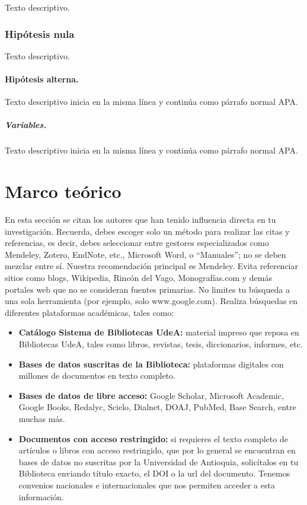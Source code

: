    Texto descriptivo.
    
    \subsubsection{Hipótesis nula}

    Texto descriptivo.

        \paragraph{Hipótesis alterna. }
        
        Texto descriptivo inicia en la misma línea y continúa como párrafo normal APA.
        
        \subparagraph{Variables.}
        
        Texto descriptivo inicia en la misma línea y continúa como párrafo normal APA.

\newpage
\section{Marco teórico}

En esta sección se citan los autores que han tenido influencia directa en tu investigación. Recuerda, debes escoger solo un método para realizar las citas y referencias, es decir, debes seleccionar entre gestores especializados como Mendeley, Zotero, EndNote, etc., Microsoft Word, o “Manuales”; no se deben mezclar entre sí. Nuestra recomendación principal es Mendeley. Evita referenciar sitios como blogs, Wikipedia, Rincón del Vago, Monografías.com y demás portales web que no se consideran fuentes primarias. No limites tu búsqueda a una sola herramienta (por ejemplo, solo www.google.com). Realiza búsquedas en diferentes plataformas académicas, tales como:

\begin{itemize}
    \item \textbf{Catálogo Sistema de Bibliotecas UdeA:} material impreso que reposa en Bibliotecas UdeA, tales como libros, revistas, tesis, diccionarios, informes, etc.
    \item\textbf{Bases de datos suscritas de la Biblioteca:} plataformas digitales con millones de documentos en texto completo.
    \item\textbf{Bases de datos de libre acceso:} Google Scholar, Microsoft Academic, Google Books, Redalyc, Scielo, Dialnet, DOAJ, PubMed, Base Search, entre muchas más.
    \item\textbf{Documentos con acceso restringido:} si requieres el texto completo de artículos o libros con acceso restringido, que por lo general se encuentran en bases de datos no suscritas por la Universidad de Antioquia, solicítalos en tu Biblioteca enviando título exacto, el DOI o la url del documento. Tenemos convenios nacionales e internacionales que nos permiten acceder a esta información.
\end{itemize}

